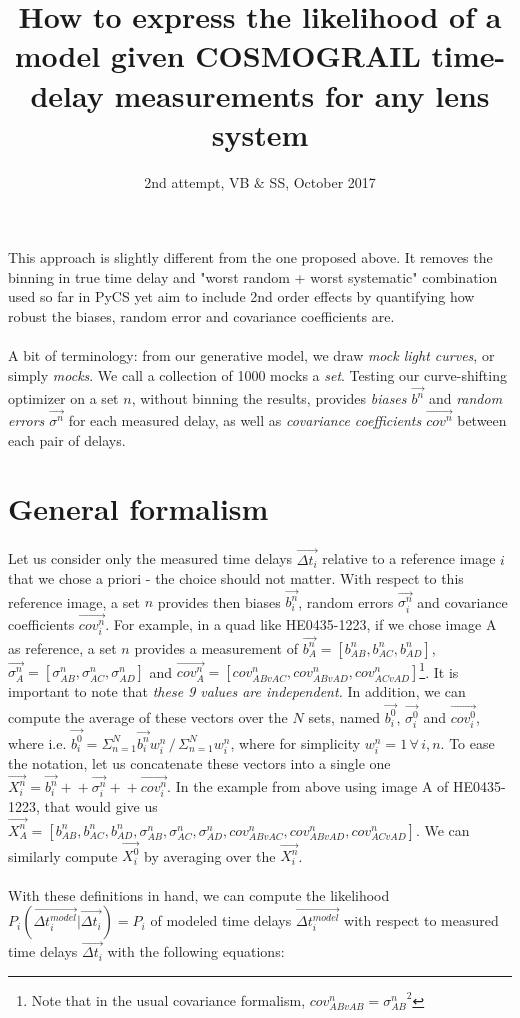 \documentclass[11pt]{scrartcl}
\renewcommand{\vec}{\overrightarrow}  %
\begin{document}
\title{How to express the likelihood of a model given 
COSMOGRAIL time-delay measurements for any lens system}
\subtitle{2nd attempt, VB $\&$ SS, October 2017}
\date{}
\maketitle


This approach is slightly different from the one proposed above. It 
removes the binning in true time delay and "worst random + worst 
systematic" combination used so far in PyCS yet aim to include 2nd 
order 
effects by quantifying how robust the biases, random error and 
covariance coefficients are.\\
\\
A bit of terminology: from our generative model, we draw \emph{mock 
light curves}, or simply \emph{mocks}. We call a collection of 1000 
mocks a \emph{set}. Testing our curve-shifting optimizer on a 
set $n$, without binning the results, provides \emph{biases 
$\vec{b^n}$} and \emph{random errors $\vec{\sigma^n}$} for each 
measured delay, as well as \emph{covariance coefficients $\vec{cov^n}$} 
between each pair of delays.

\section{General formalism}

Let us consider only the measured time delays $\vec{\Delta t_{i}}$ 
relative to a reference image $i$ that we chose a priori - the choice 
should not matter. With respect to this reference image, a set $n$ 
provides then biases $\vec{b^n_i}$, random errors $\vec{\sigma^n_i}$ 
and covariance coefficients $\vec{cov^n_i}$. For example, in a quad 
like HE0435-1223, if we chose image A as reference, a set $n$ 
provides a measurement of $\vec{b^n_A} = [b^n_{AB}, b^n_{AC}, 
b^n_{AD}]$, 
$\vec{\sigma^n_A} = [\sigma^n_{AB}, \sigma^n_{AC}, \sigma^n_{AD}]$ and 
$\vec{cov^n_A} = [cov^n_{ABvAC}, cov^n_{ABvAD}, 
cov^n_{ACvAD}]$\footnote{Note that in the usual covariance formalism, 
$cov^n_{ABvAB} = {\sigma^n_{AB}}^2$}.  It is 
important to note that \emph{these 9 values are independent.} In 
addition, we can compute the average of these vectors over the $N$ 
sets, named $\vec{b^0_i}$, $\vec{\sigma^0_i}$ and $\vec{cov^0_i}$, 
where i.e. $\vec{b^0_i} = \Sigma_{n=1}^N \vec{b^n_i}w_i^n \, / \, 
\Sigma_{n=1}^Nw_i^n$, where for simplicity $w_i^n=1 \,\forall\, i,n$. 
To ease the notation, let us concatenate these vectors into a single 
one $\vec{X^n_i} = 
\vec{b^n_i}+\!\!+\vec{\sigma^n_i}+\!\!+\vec{cov^n_i}$. In the example 
from above using image A of HE0435-1223, that would give us 
$\vec{X^n_A} = [b^n_{AB}, b^n_{AC}, b^n_{AD}, \sigma^n_{AB}, 
\sigma^n_{AC}, \sigma^n_{AD}, cov^n_{ABvAC}, cov^n_{ABvAD}, 
cov^n_{ACvAD}]$. We can similarly compute $\vec{X^0_i}$ by averaging 
over the $\vec{X^n_i}$.\\
\\
With these definitions in hand, we can compute the likelihood 
$P_i(\vec{\Delta t_{i}^{model}}|\vec{\Delta t_{i}}) = P_i$ of modeled 
time delays $\vec{\Delta t_{i}^{model}}$ with respect to measured time 
delays $\vec{\Delta t_{i}}$ with the following equations:
\end{document}
